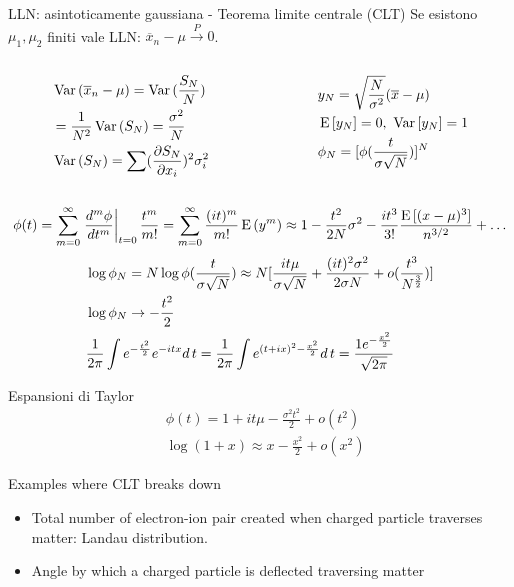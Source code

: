 \begin{frame}{LLN: asintoticamente gaussiana - Teorema limite centrale (CLT)}
Se esistono $\mu_1, \mu_2$ finiti vale LLN: $\overline{x}_n-\mu\xrightarrow{P}0$.
\begin{columns}[T]
\begin{column}{0.5\textwidth}
\begin{align*}
&\var{(\overline{x}_n-\mu)}=\var{(\frac{S_N}{N})}\\
&=\frac{1}{N^2}\var{(S_N)}=\frac{\sigma^2}{N}\\
&\var{(S_N)}=\sum(\PDy{x_i}{S_N})^2\sigma_i^2
\end{align*}
\end{column}
\begin{column}{0.5\textwidth}
\begin{align*}
&y_N=\sqrt{\frac{N}{\sigma^2}}(\overline{x}-\mu)\\
&\E{[y_N]}=0,\ \var{[y_N]}=1\\
&\phi_N=[\phi(\frac{t}{\sigma\sqrt{N}})]^N
\end{align*}
\end{column}
\end{columns}
\[\phi(t)=\sum_{m=0}^{\infty}\left.\frac{d^m\phi}{dt^m}\right|_{t=0}\frac{t^m}{m!}=\sum_{m=0}^{\infty}\frac{(it)^m}{m!}\E{(y^m)}\approx1-\frac{t^2}{2N}\sigma^2-\frac{it^3}{3!}\frac{\E{[(x-\mu)^3]}}{n\expy{3/2}}+\ldots\]
\begin{align*}
&\log{\phi_N}=N\log{\phi(\frac{t}{\sigma\sqrt{N}})}\approx N[\frac{it\mu}{\sigma\sqrt{N}}+\frac{(it)^2\sigma^2}{2\sigma N}+o(\frac{t^3}{N\expy{\frac{3}{2}}})]\\
&\log{\phi_N}\to-\frac{t^2}{2}\\
&\frac{1}{2\pi}\int\exp{-\frac{t^2}{2}}\exp{-itx}d\,t=\frac{1}{2\pi}\int\exp{(t+ix)^2-\frac{x^2}{2}}d\,t=\frac{1\exp{-\frac{x^2}{2}}}{\sqrt{2\pi}}
\end{align*}
\end{frame}

\begin{wordonframe}{Espansioni di Taylor}
\begin{align*}
&\phi(t)=1+it\mu-\frac{\sigma^2t^2}{2}+o(t^2)\\
&\log{(1+x)}\approx x-\frac{x^2}{2}+o(x^2)
\end{align*}
\end{wordonframe}

\begin{frame}{Examples where CLT breaks down}
\begin{itemize}
\item Total number of electron-ion pair created when charged particle traverses matter: Landau distribution.
\item Angle by which a charged particle is deflected traversing matter
\end{itemize}
\end{frame}

